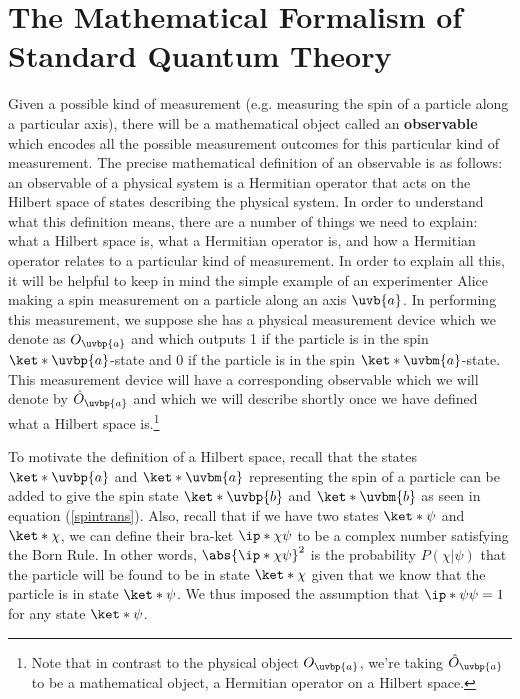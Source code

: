 \documentclass[12pt]{report}
\begin{document}
\section{The Mathematical Formalism of Standard Quantum Theory}
Given a possible kind of measurement (e.g. measuring the spin of a particle along a particular axis), there will be a mathematical object called an \textbf{observable} which encodes all the possible measurement outcomes for this particular kind of measurement. The precise mathematical definition of an observable is as follows: an observable of a physical system is a Hermitian operator that acts on the Hilbert space of states describing the physical system. In order to understand what this definition means, there are a number of things we need to explain: what a Hilbert space is, what a Hermitian operator is, and how a Hermitian operator relates to a particular kind of measurement. In order to explain all this, it will be helpful to keep in mind the simple example of an experimenter Alice making a spin measurement on a particle along an axis $\uvb{a}$. In performing this measurement, we suppose she has a physical measurement device which we denote as $O_{\uvbp{a}}$ %
%
and which outputs 1 if the particle is in the spin $\ket*{\uvbp{a}}$-state and 0 if the particle is in the spin $\ket*{\uvbm{a}}$-state. This measurement device will have a corresponding observable which we will denote by $\hat{O}_{\uvbp{a}}$ %
%
and which we will describe shortly once we have defined what a Hilbert space is.\footnote{Note that in contrast to the physical object $O_{\uvbp{a}}$, we're taking $\hat{O}_{\uvbp{a}}$ to be a mathematical object, a Hermitian operator on a Hilbert space.}  

To motivate the definition of a Hilbert space, recall that the states $\ket*{\uvbp{a}}$ and $\ket*{\uvbm{a}}$ representing the spin of  a particle can be added to give the spin state $\ket*{\uvbp{b}}$ and $\ket*{\uvbm{b}}$ as seen in equation (\ref{spintrans}). Also, recall that if we have two states $\ket*{\psi}$ and $\ket*{\chi}$, we can define their bra-ket $\ip*{\chi}{\psi}$ to be a complex number satisfying the Born Rule. In other words, $\abs{\ip*{\chi}{\psi}}^2$ is the probability $P(\chi|\psi)$ that the particle will be found to be in state $\ket*{\chi}$ given that we know that the particle is in state $\ket*{\psi}$. We thus imposed the assumption that  $\ip*{\psi}{\psi}=1$ for any state $\ket*{\psi}$. 
\end{document}
